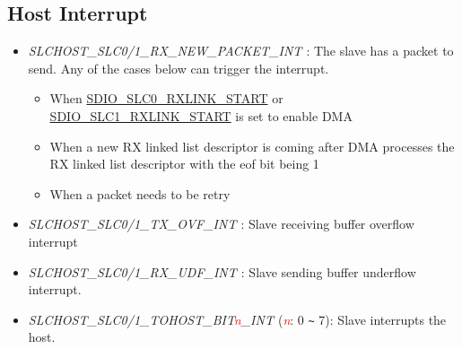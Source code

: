 \documentclass[main\_\_EN.tex]{subfiles}
\begin{document}
\subsection{Host Interrupt}
\begin{itemize}
\item {\it SLCHOST\_SLC0/1\_RX\_NEW\_PACKET\_INT \label{int:SLCHOSTSLC01RXNEWPACKETINT}}: The slave has a packet to send. Any of the cases below can trigger the interrupt.
    \begin{itemize}
        \item When \hyperref[fielddesc:SDIOSLC0RXLINKSTART]{SDIO\_SLC0\_RXLINK\_START} or \hyperref[fielddesc:SDIOSLC1RXLINKSTART]{SDIO\_SLC1\_RXLINK\_START} is set to enable DMA
        \item When a new RX linked list descriptor is coming after DMA processes the RX linked list descriptor with the eof bit being 1 
        \item When a packet needs to be retry
    \end{itemize}
\item {\it SLCHOST\_SLC0/1\_TX\_OVF\_INT \label{int:SLCHOSTSLC01TXOVFINT}}: Slave receiving buffer overflow interrupt
\item {\it SLCHOST\_SLC0/1\_RX\_UDF\_INT \label{int:SLCHOSTSLC01RXUDFINT}}: Slave sending buffer underflow interrupt.
\item {\it SLCHOST\_SLC0/1\_TOHOST\_BIT\textcolor{red}{\it{n}}\_INT \label{int:SLCHOSTSLC01TOHOSTBITnINT}} (\textcolor{red}{\it{n}}: 0 \verb+~+ 7): Slave interrupts the host.
\end{itemize}
\end{document}
